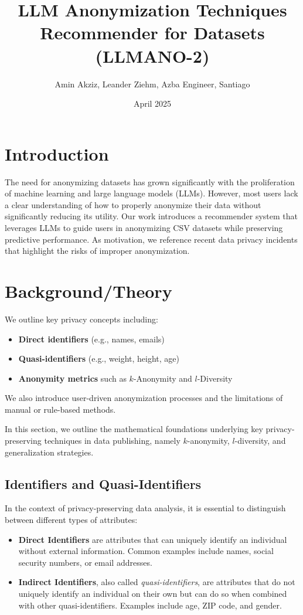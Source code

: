 \documentclass{article}
\title{LLM Anonymization Techniques Recommender for Datasets (LLMANO-2)}
\author{Amin Akziz, Leander Ziehm, Azba Engineer, Santiago}
\date{April 2025}
\begin{document}
\maketitle

\section{Introduction}
The need for anonymizing datasets has grown significantly with the proliferation of machine learning and large language models (LLMs). However, most users lack a clear understanding of how to properly anonymize their data without significantly reducing its utility. Our work introduces a recommender system that leverages LLMs to guide users in anonymizing CSV datasets while preserving predictive performance. As motivation, we reference recent data privacy incidents that highlight the risks of improper anonymization.

\section{Background/Theory}
We outline key privacy concepts including:
\begin{itemize}
    \item \textbf{Direct identifiers} (e.g., names, emails)
    \item \textbf{Quasi-identifiers} (e.g., weight, height, age)
    \item \textbf{Anonymity metrics} such as $k$-Anonymity and $l$-Diversity
\end{itemize}
We also introduce user-driven anonymization processes and the limitations of manual or rule-based methods.

In this section, we outline the mathematical foundations underlying key privacy-preserving techniques in data publishing, namely $k$-anonymity, $l$-diversity, and generalization strategies.

\subsection{Identifiers and Quasi-Identifiers}

In the context of privacy-preserving data analysis, it is essential to distinguish between different types of attributes:

\begin{itemize}
\item \textbf{Direct Identifiers} are attributes that can uniquely identify an individual without external information. Common examples include names, social security numbers, or email addresses.

\item \textbf{Indirect Identifiers}, also called \textit{quasi-identifiers}, are attributes that do not uniquely identify an individual on their own but can do so when combined with other quasi-identifiers. Examples include age, ZIP code, and gender.
\end{itemize}
\end{document}
